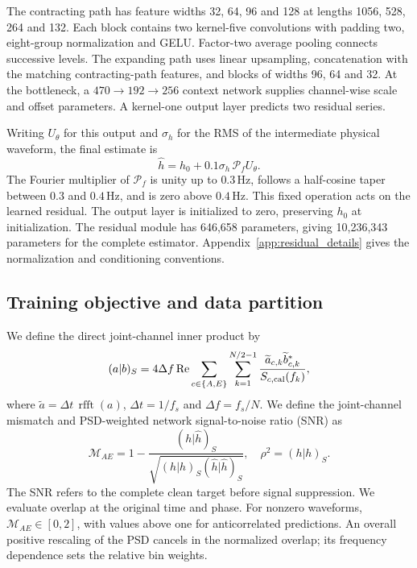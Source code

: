 \documentclass[10pt,prd,aps,a4paper,twocolumn,superscriptaddress,nofootinbib,floatfix]{revtex4-2}
\begin{document}
The contracting path has feature widths 32, 64, 96 and 128 at lengths 1056, 528, 264 and 132. Each block contains two kernel-five convolutions with padding two, eight-group normalization and GELU. Factor-two average pooling connects successive levels. The expanding path uses linear upsampling, concatenation with the matching contracting-path features, and blocks of widths 96, 64 and 32. At the bottleneck, a $470\to192\to256$ context network supplies channel-wise scale and offset parameters. A kernel-one output layer predicts two residual series.

Writing $U_\theta$ for this output and $\sigma_h$ for the RMS of the intermediate physical waveform, the final estimate is
\begin{equation}
\widehat h=h_0+0.1\sigma_h\,\mathcal P_f U_\theta.\label{eq:multiscale_output}
\end{equation}
The Fourier multiplier of $\mathcal P_f$ is unity up to $0.3\,\mathrm{Hz}$, follows a half-cosine taper between $0.3$ and $0.4\,\mathrm{Hz}$, and is zero above $0.4\,\mathrm{Hz}$. This fixed operation acts on the learned residual. The output layer is initialized to zero, preserving $h_0$ at initialization. The residual module has 646,658 parameters, giving 10,236,343 parameters for the complete estimator. Appendix~\ref{app:residual_details} gives the normalization and conditioning conventions.

\subsection{Training objective and data partition}\label{loss}
We define the direct joint-channel inner product by
\begin{equation}
(a|b)_S=4\Delta f\operatorname{Re}
\sum_{c\in\{A,E\}}\sum_{k=1}^{N/2-1}
\frac{\widetilde a_{c,k}\widetilde b_{c,k}^{*}}{S_{c,\rm cal}(f_k)},\label{eq:joint_inner}
\end{equation}
where $\widetilde a=\Delta t\,\operatorname{rfft}(a)$, $\Delta t=1/f_s$ and $\Delta f=f_s/N$. We define the joint-channel mismatch and PSD-weighted network signal-to-noise ratio (SNR) as
\begin{equation}
\mathcal M_{AE}=1-\frac{(h|\widehat h)_S}{\sqrt{(h|h)_S(\widehat h|\widehat h)_S}},\quad
\rho^2=(h|h)_S.\label{eq:joint_mismatch}
\end{equation}
The SNR refers to the complete clean target before signal suppression. We evaluate overlap at the original time and phase. For nonzero waveforms, $\mathcal M_{AE}\in[0,2]$, with values above one for anticorrelated predictions. An overall positive rescaling of the PSD cancels in the normalized overlap; its frequency dependence sets the relative bin weights.
\end{document}
